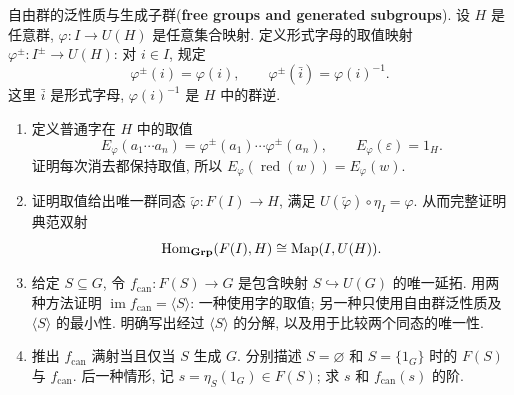 \documentclass{article}
\begin{document}
\begin{problem}
  {\heiti 自由群的泛性质与生成子群}(\textbf{free groups and generated subgroups}). 设 $H$ 是任意群, $\varphi:I\to U(H)$ 是任意集合映射. 定义形式字母的取值映射 $\varphi^\pm:I^\pm\to U(H)$: 对 $i\in I$, 规定
  \[
    \varphi^\pm(i)=\varphi(i),\qquad
    \varphi^\pm(\bar i)=\varphi(i)^{-1}.
  \]
  这里 $\bar i$ 是形式字母, $\varphi(i)^{-1}$ 是 $H$ 中的群逆.
  \begin{enumerate}
    \item[(a)] 定义普通字在 $H$ 中的取值
      \[
        E_\varphi(a_1\cdots a_n)
        =\varphi^\pm(a_1)\cdots\varphi^\pm(a_n),\qquad
        E_\varphi(\varepsilon)=1_H.
      \]
      证明每次消去都保持取值, 所以 $E_\varphi(\operatorname{red}(w))=E_\varphi(w)$.
    \item[(b)] 证明取值给出唯一群同态 $\widetilde\varphi:F(I)\to H$, 满足 $U(\widetilde\varphi)\circ\eta_I=\varphi$. 从而完整证明典范双射
      \[
        \operatorname{Hom}_{\mathbf{Grp}}(F(I),H)\cong\operatorname{Map}(I,U(H)).
      \]
    \item[(c)] 给定 $S\subseteq G$, 令 $f_{\mathrm{can}}:F(S)\to G$ 是包含映射 $S\hookrightarrow U(G)$ 的唯一延拓. 用两种方法证明 $\operatorname{im}f_{\mathrm{can}}=\langle S\rangle$: 一种使用字的取值; 另一种只使用自由群泛性质及 $\langle S\rangle$ 的最小性. 明确写出经过 $\langle S\rangle$ 的分解, 以及用于比较两个同态的唯一性.
    \item[(d)] 推出 $f_{\mathrm{can}}$ 满射当且仅当 $S$ 生成 $G$. 分别描述 $S=\varnothing$ 和 $S=\{1_G\}$ 时的 $F(S)$ 与 $f_{\mathrm{can}}$. 后一种情形, 记 $s=\eta_S(1_G)\in F(S)$; 求 $s$ 和 $f_{\mathrm{can}}(s)$ 的阶.
  \end{enumerate}
\end{problem}
\end{document}
